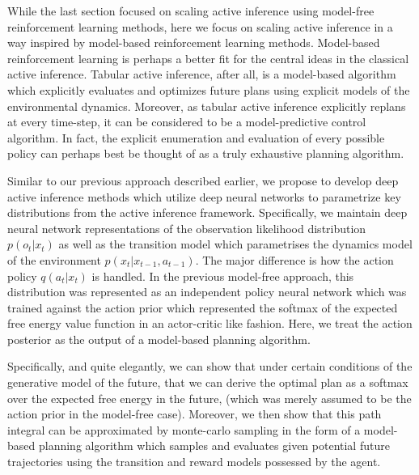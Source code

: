 While the last section focused on scaling active inference using model-free reinforcement learning methods, here we focus on scaling active inference in a way inspired by model-based reinforcement learning methods.
Model-based reinforcement learning is perhaps a better fit for the central ideas in the classical active inference. Tabular active inference, after all, is a model-based algorithm which explicitly evaluates and optimizes future plans using explicit models of the environmental dynamics. Moreover, as tabular active inference explicitly replans at every time-step, it can be considered to be a model-predictive control algorithm. In fact, the explicit enumeration and evaluation of every possible policy can perhaps best be thought of as a truly exhaustive planning algorithm.

Similar to our previous approach described earlier, we propose to develop deep active inference methods which utilize deep neural networks to parametrize key distributions from the active inference framework. Specifically, we maintain deep neural network representations of the observation likelihood distribution $p(o_t | x_t)$ as well as the transition model which parametrises the dynamics model of the environment $p(x_t | x_{t-1}, a_{t-1})$. The major difference is how the action policy $q(a_t | x_t)$ is handled. In the previous model-free approach, this distribution was represented as an independent policy neural network which was trained against the action prior which represented the softmax of the expected free energy value function in an actor-critic like fashion. Here, we treat the action posterior as the output of a model-based planning algorithm.

Specifically, and quite elegantly, we can show that under certain conditions of the generative model of the future, that we can derive the optimal plan as a softmax over the expected free energy in the future, (which was merely assumed to be the action prior in the model-free case). Moreover, we then show that this path integral can be approximated by monte-carlo sampling in the form of a model-based planning algorithm which samples and evaluates given potential future trajectories using the transition and reward models possessed by the agent.

